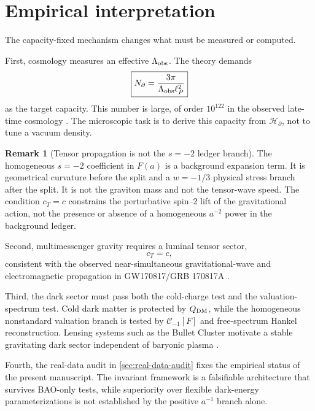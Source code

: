 \documentclass[aps,prd,reprint,nofootinbib,superscriptaddress]{revtex4-2}
\numberwithin{equation}{section}
\theoremstyle{definition}
\newtheorem{remark}{Remark}[section]
\theoremstyle{plain}
\newcommand{\Ncap}{N_{\partial}}
\begin{document}
\section{Empirical interpretation}

The capacity-fixed mechanism changes what must be measured or computed.

First, cosmology measures an effective \(\Lambda_{\rm obs}\).  The theory demands
\begin{equation}
\boxed{
\Ncap
=
\frac{3\pi}{\Lambda_{\rm obs}\ell_P^2}
}
\end{equation}
as the target capacity.  This number is large, of order \(10^{122}\) in the observed late-time cosmology \cite{Planck2018}.  The microscopic task is to derive this capacity from \(\mathcal H_\partial\), not to tune a vacuum density.


\begin{remark}[Tensor propagation is not the \(s=-2\) ledger branch]
The homogeneous \(s=-2\) coefficient in \(F(a)\) is a background expansion term.  It is geometrical curvature before the split and a \(w=-1/3\) physical stress branch after the split.  It is not the graviton mass and not the tensor-wave speed.  The condition \(c_T=c\) constrains the perturbative spin--2 lift of the gravitational action, not the presence or absence of a homogeneous \(a^{-2}\) power in the background ledger.
\end{remark}


Second, multimessenger gravity requires a luminal tensor sector,
\begin{equation}
\boxed{c_T=c,}
\end{equation}
consistent with the observed near-simultaneous gravitational-wave and electromagnetic propagation in GW170817/GRB 170817A \cite{AbbottGW170817,MonitorGRB170817A}.

Third, the dark sector must pass both the cold-charge test and the valuation-spectrum test.  Cold dark matter is protected by \(Q_{\rm DM}\), while the homogeneous nonstandard valuation branch is tested by \(\mathcal C_{-1}[F]\) and free-spectrum Hankel reconstruction.  Lensing systems such as the Bullet Cluster motivate a stable gravitating dark sector independent of baryonic plasma \cite{Clowe2006,Markevitch2004}.

Fourth, the real-data audit in \cref{sec:real-data-audit} fixes the empirical status of the present manuscript.  The invariant framework is a falsifiable architecture that survives BAO-only tests, while superiority over flexible dark-energy parameterizations is not established by the positive \(a^{-1}\) branch alone.
\end{document}
